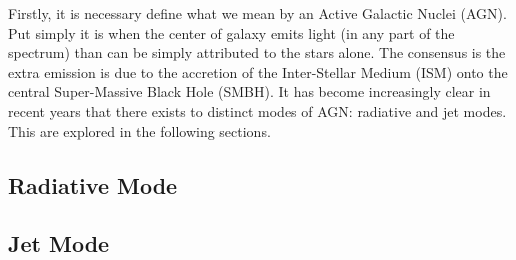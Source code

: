 	Firstly, it is necessary define what we mean by an Active Galactic Nuclei (AGN). Put simply it is when the center of galaxy emits light (in any part of the spectrum) than can be simply attributed to the stars alone. The consensus is the extra emission is due to the accretion of the Inter-Stellar Medium (ISM) onto the central Super-Massive Black Hole (SMBH). It has become increasingly clear in recent years that there exists to distinct modes of AGN: radiative and jet modes. This are explored in the following sections.

	\subsection{Radiative Mode}
		\label{subsec:introRadiative}

	\subsection{Jet Mode}
		\label{subsec:introJet}
